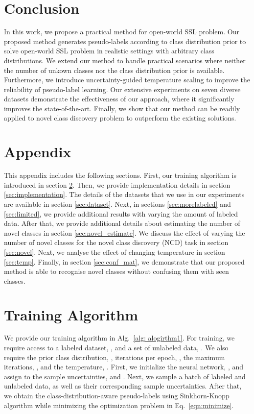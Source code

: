 \documentclass[runningheads]{eccv2022submission}
\begin{document}
\section{Conclusion}
In this work, we propose a practical method for open-world SSL problem. Our proposed method generates pseudo-labels according to class distribution prior to solve open-world SSL problem in realistic settings with arbitrary class distributions. We extend our method to handle practical scenarios where neither the number of unkown classes nor the class distribution prior is available. Furthermore, we introduce uncertainty-guided temperature scaling to improve the reliability of pseudo-label learning. Our extensive experiments on seven diverse datasets demonstrate the effectiveness of our approach, where it significantly improves the state-of-the-art. Finally, we show that our method can be readily applied to novel class discovery problem to outperform the existing solutions.

\clearpage




\appendix
\section*{Appendix}
This appendix includes the following sections. First, our training algorithm is introduced in section \ref{sec:alogrithm}. Then, we provide implementation details in section \ref{sec:implementation}. The details of the datasets that we use in our experiments are available in section \ref{sec:dataset}. Next, in sections \ref{sec:morelabeled} and \ref{sec:limited}, we provide additional results with varying the amount of labeled data. After that, we provide additional details about estimating the number of novel classes in section \ref{sec:novel_estimate}. We discuss the effect of varying the number of novel classes for the novel class discovery (NCD) task in section \ref{sec:novel}. Next, we analyse the effect of changing temperature in section \ref{sec:temp}. Finally, in section \ref{sec:conf_mat}, we demonstrate that our proposed method is able to recognise novel classes without confusing them with seen classes. 

\section{Training Algorithm}
\label{sec:alogrithm}

We provide our training algorithm in Alg.~\ref{alg: alogirthm1}. For training, we require access to a labeled dataset, , and a set of unlabeled data, . We also require the prior class distribution, , iterations per epoch, , the maximum iterations, , and the temperature, . First, we initialize the neural network, , and assign  to the sample uncertainties,  and . Next, we sample a batch of labeled and unlabeled data, as well as their corresponding sample uncertainties. After that, we obtain the class-distribution-aware pseudo-labels using Sinkhorn-Knopp algorithm\cite{sinkhorn1967concerning} while minimizing the optimization problem in Eq.~\ref{eqn:minimize}. 
\end{document}
